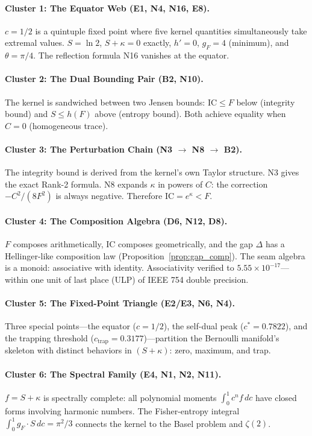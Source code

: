 \documentclass[
  aps,
  prd,
  twocolumn,
  superscriptaddress,
  nofootinbib,
  floatfix
]{revtex4-2}
\newcommand{\IC}{\mathrm{IC}}
\newcommand{\gF}{g_{\!F}}
\begin{document}
\paragraph{Cluster 1: The Equator Web (E1, N4, N16, E8).}
$c = 1/2$ is a quintuple fixed point where five kernel quantities
simultaneously take extremal values.  $S = \ln 2$, $S + \kappa = 0$
exactly, $h' = 0$, $\gF = 4$ (minimum), and $\theta = \pi/4$.
The reflection formula N16 vanishes at the equator.

\paragraph{Cluster 2: The Dual Bounding Pair (B2, N10).}
The kernel is sandwiched between two Jensen bounds:
$\IC \leq F$ below (integrity bound) and $S \leq h(F)$ above
(entropy bound).  Both achieve equality when $C = 0$
(homogeneous trace).

\paragraph{Cluster 3: The Perturbation Chain (N3 $\to$ N8 $\to$ B2).}
The integrity bound is derived from the kernel's own Taylor
structure.  N3 gives the exact Rank-2 formula.  N8 expands
$\kappa$ in powers of $C$: the correction $-C^2/(8F^2)$ is always
negative.  Therefore $\IC = e^\kappa < F$.

\paragraph{Cluster 4: The Composition Algebra (D6, N12, D8).}
$F$ composes arithmetically, $\IC$ composes geometrically, and
the gap $\Delta$ has a Hellinger-like composition law
(Proposition~\ref{prop:gap_comp}).
The seam algebra is a monoid: associative with identity.
Associativity verified to $5.55 \times 10^{-17}$---within one
unit of last place (ULP) of IEEE 754 double precision.

\paragraph{Cluster 5: The Fixed-Point Triangle (E2/E3, N6, N4).}
Three special points---the equator ($c = 1/2$), the self-dual peak
($c^* = 0.7822$), and the trapping threshold
($c_\mathrm{trap} = 0.3177$)---partition the Bernoulli manifold's
skeleton with distinct behaviors in $(S + \kappa)$:
zero, maximum, and trap.

\paragraph{Cluster 6: The Spectral Family (E4, N1, N2, N11).}
$f = S + \kappa$ is spectrally complete: all polynomial moments
$\int_0^1 c^n f\,dc$ have closed forms involving harmonic numbers.
The Fisher-entropy integral $\int_0^1 \gF \cdot S\,dc = \pi^2/3$
connects the kernel to the Basel problem and $\zeta(2)$.
\end{document}
